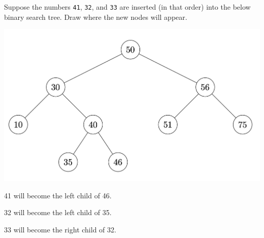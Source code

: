 \begin{prob}
    Suppose the numbers
        \texttt{41},
        \texttt{32},
        and
        \texttt{33}
    are inserted (in that order) into the below binary search tree. Draw where
    the new nodes will appear.

    \includegraphics{./bst.png}

    \begin{soln}
        41 will become the left child of 46.

        32 will become the left child of 35.

        33 will become the right child of 32.
    \end{soln}

\end{prob}
